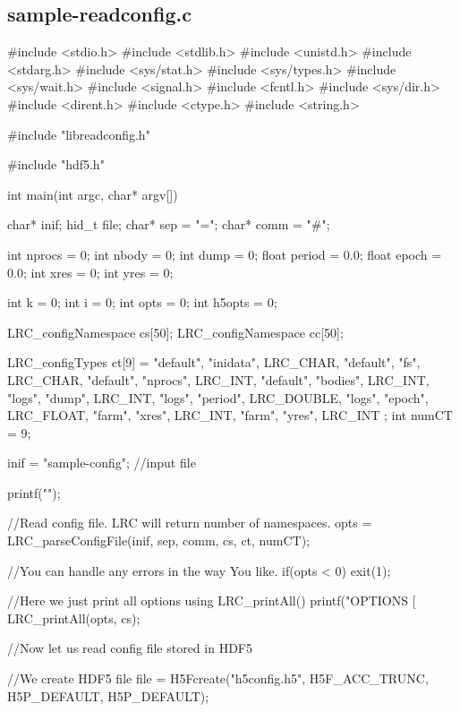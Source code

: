 \hypertarget{sample-readconfig_8c-example}{
\subsection{sample-\/readconfig.c}
}

\begin{DoxyCodeInclude}

#include <stdio.h>
#include <stdlib.h>
#include <unistd.h>
#include <stdarg.h>
#include <sys/stat.h>
#include <sys/types.h>
#include <sys/wait.h>
#include <signal.h>
#include <fcntl.h>
#include <sys/dir.h>
#include <dirent.h>
#include <ctype.h>
#include <string.h>

#include "libreadconfig.h"

#include "hdf5.h"

int main(int argc, char* argv[]){

        char* inif; 
  hid_t file;
  char* sep = "=";
  char* comm = "#";

        int nprocs = 0;
  int nbody = 0;
  int dump = 0;
        float period = 0.0;
  float epoch = 0.0;
  int xres = 0;
  int yres = 0;
        
  int k = 0;
        int i = 0;
  int opts = 0;
  int h5opts = 0;

  LRC_configNamespace cs[50];
  LRC_configNamespace cc[50];

  LRC_configTypes ct[9] = {
    {"default", "inidata", LRC_CHAR},
    {"default", "fs", LRC_CHAR},
    {"default", "nprocs", LRC_INT},
    {"default", "bodies", LRC_INT},
    {"logs", "dump", LRC_INT},
    {"logs", "period", LRC_DOUBLE},
    {"logs", "epoch", LRC_FLOAT},
    {"farm", "xres", LRC_INT},
    {"farm", "yres", LRC_INT}
  };
  int numCT = 9;
        
  inif = "sample-config"; //input file
        
  printf("\n");
  
  //Read config file. LRC will return number of namespaces.
  opts = LRC_parseConfigFile(inif, sep, comm, cs, ct, numCT);
  
  //You can handle any errors in the way You like.
  if(opts < 0) exit(1);

  //Here we just print all options using LRC_printAll()
        printf("\nALL OPTIONS [%
  LRC_printAll(opts, cs);

  //Now let us read config file stored in HDF5

  //We create HDF5 file
  file = H5Fcreate("h5config.h5", H5F_ACC_TRUNC, H5P_DEFAULT, H5P_DEFAULT);
  
}
\end{DoxyCodeInclude}
